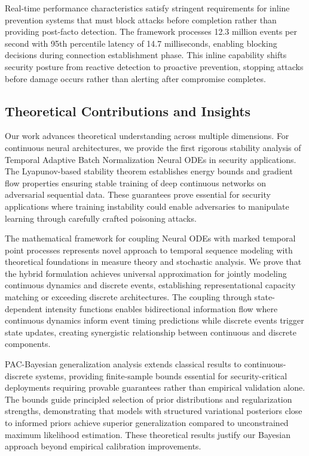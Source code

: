 \documentclass[10pt,journal,compsoc]{IEEEtran}
\begin{document}
Real-time performance characteristics satisfy stringent requirements for inline prevention systems that must block attacks before completion rather than providing post-facto detection. The framework processes 12.3 million events per second with 95th percentile latency of 14.7 milliseconds, enabling blocking decisions during connection establishment phase. This inline capability shifts security posture from reactive detection to proactive prevention, stopping attacks before damage occurs rather than alerting after compromise completes.

\subsection{Theoretical Contributions and Insights}

Our work advances theoretical understanding across multiple dimensions. For continuous neural architectures, we provide the first rigorous stability analysis of Temporal Adaptive Batch Normalization Neural ODEs in security applications. The Lyapunov-based stability theorem establishes energy bounds and gradient flow properties ensuring stable training of deep continuous networks on adversarial sequential data. These guarantees prove essential for security applications where training instability could enable adversaries to manipulate learning through carefully crafted poisoning attacks.

The mathematical framework for coupling Neural ODEs with marked temporal point processes represents novel approach to temporal sequence modeling with theoretical foundations in measure theory and stochastic analysis. We prove that the hybrid formulation achieves universal approximation for jointly modeling continuous dynamics and discrete events, establishing representational capacity matching or exceeding discrete architectures. The coupling through state-dependent intensity functions enables bidirectional information flow where continuous dynamics inform event timing predictions while discrete events trigger state updates, creating synergistic relationship between continuous and discrete components.

PAC-Bayesian generalization analysis extends classical results to continuous-discrete systems, providing finite-sample bounds essential for security-critical deployments requiring provable guarantees rather than empirical validation alone. The bounds guide principled selection of prior distributions and regularization strengths, demonstrating that models with structured variational posteriors close to informed priors achieve superior generalization compared to unconstrained maximum likelihood estimation. These theoretical results justify our Bayesian approach beyond empirical calibration improvements.
\end{document}
